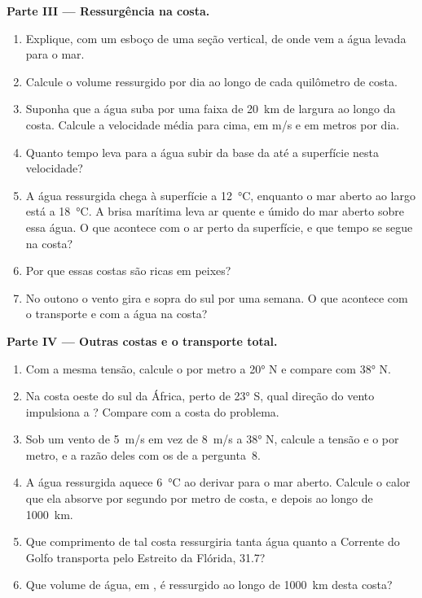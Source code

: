 \begin{problem}
\medskip
\noindent\textbf{Parte III --- Ressurgência na costa.}
\begin{enumerate}[resume]
  \item Explique, com um esboço de uma seção vertical, de onde vem a água levada
        para o mar.
  \item Calcule o volume ressurgido por dia ao longo de cada quilômetro de costa.
  \item Suponha que a água suba por uma faixa de \qty{20}{km} de largura ao longo da
        costa. Calcule a velocidade média para cima, em \unit{m/s} e em metros por dia.
  \item Quanto tempo leva para a água subir da base da  até a
        superfície nesta velocidade?
  \item A água ressurgida chega à superfície a \qty{12}{\celsius}, enquanto o mar aberto
        ao largo está a \qty{18}{\celsius}. A brisa marítima leva ar quente e úmido do
        mar aberto sobre essa água. O que acontece com o ar perto da superfície, e que
        tempo se segue na costa?
  \item Por que essas costas são ricas em peixes?
  \item No outono o vento gira e sopra do sul por uma semana. O que acontece
        com o transporte e com a água na costa?
\end{enumerate}

\medskip
\noindent\textbf{Parte IV --- Outras costas e o transporte total.}
\begin{enumerate}[resume]
  \item Com a mesma tensão, calcule o  por metro a \ang{20} N
        e compare com \ang{38} N.
  \item Na costa oeste do sul da África, perto de \ang{23} S, qual direção do vento
        impulsiona a ? Compare com a costa do problema.
  \item Sob um vento de \qty{5}{m/s} em vez de \qty{8}{m/s} a \ang{38} N, calcule
        a tensão e o  por metro, e a razão deles com os de
        a pergunta~8.
  \item A água ressurgida aquece \qty{6}{\celsius} ao derivar para o mar aberto. Calcule
        o calor que ela absorve por segundo por metro de costa, e depois ao longo de
        \qty{1000}{km}.
  \item Que comprimento de tal costa ressurgiria tanta água quanto a Corrente do Golfo
        transporta pelo Estreito da Flórida, \qty{31.7}{\sverdrup}?
  \item Que volume de água, em , é ressurgido ao longo de \qty{1000}{km} desta
        costa?
\end{enumerate}
\end{problem}
